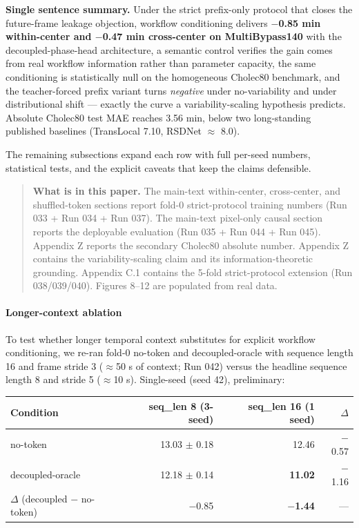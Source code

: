 \textbf{Single sentence summary.} Under the strict prefix-only protocol
that closes the future-frame leakage objection, workflow conditioning
delivers \textbf{$-$0.85 min within-center and $-$0.47 min cross-center on
MultiBypass140} with the decoupled-phase-head architecture, a semantic
control verifies the gain comes from real workflow information rather
than parameter capacity, the same conditioning is statistically null on
the homogeneous Cholec80 benchmark, and the teacher-forced prefix
variant turns \emph{negative} under no-variability and under
distributional shift --- exactly the curve a variability-scaling
hypothesis predicts. Absolute Cholec80 test MAE reaches 3.56 min, below
two long-standing published baselines (TransLocal 7.10, RSDNet $\approx$ 8.0).

The remaining subsections expand each row with full per-seed numbers,
statistical tests, and the explicit caveats that keep the claims
defensible.

\begin{quote}
\textbf{What is in this paper.} The main-text within-center, cross-center, and shuffled-token sections report fold-0
strict-protocol training numbers (Run 033 + Run 034 + Run 037). The main-text pixel-only causal section
reports the deployable evaluation (Run 035 + Run 044 +
Run 045). Appendix Z reports the secondary Cholec80 absolute number.
Appendix Z contains the variability-scaling claim and its
information-theoretic grounding. Appendix C.1 contains the 5-fold
strict-protocol extension (Run 038/039/040). Figures 8--12 are populated
from real data.
\end{quote}

\paragraph{Longer-context ablation}\label{longer-context-ablation}

To test whether longer temporal context substitutes for explicit
workflow conditioning, we re-ran fold-0 no-token and decoupled-oracle
with sequence length 16 and frame stride 3 ($\approx$50 s of context; Run 042)
versus the headline sequence length 8 and stride 5 ($\approx$10 s). Single-seed
(seed 42), preliminary:

\begin{longtable}[]{@{}lrrr@{}}
\toprule\noalign{}
Condition & seq\_len 8 (3-seed) & seq\_len 16 (1 seed) & $\Delta$ \\
\midrule\noalign{}
\endhead
\bottomrule\noalign{}
\endlastfoot
no-token & 13.03 $\pm$ 0.18 & 12.46 & $-$0.57 \\
decoupled-oracle & 12.18 $\pm$ 0.14 & \textbf{11.02} & $-$1.16 \\
$\Delta$ (decoupled $-$ no-token) & $-$0.85 & \textbf{$-$1.44} & --- \\
\end{longtable}

